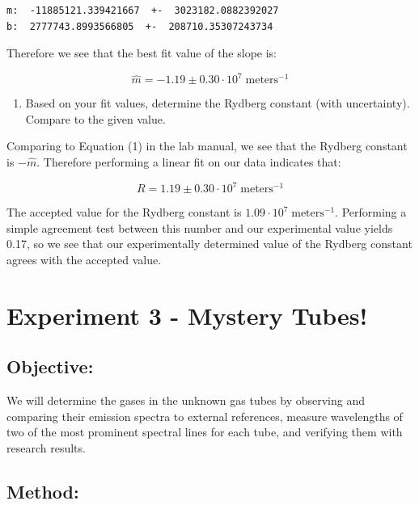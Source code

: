 \documentclass[11pt]{article}
\providecommand{\tightlist}{%
      \setlength{\itemsep}{0pt}\setlength{\parskip}{0pt}}
\begin{document}
    \begin{Verbatim}[commandchars=\\\{\}]
m:  -11885121.339421667  +-  3023182.0882392027
b:  2777743.8993566805  +-  208710.35307243734
\end{Verbatim}

    Therefore we see that the best fit value of the slope is:

\[\boxed{\hat{m} = -1.19 \pm 0.30 \cdot 10^7 \; \text{meters} ^{-1}}\]

\begin{enumerate}
\def\labelenumi{\alph{enumi})}
\setcounter{enumi}{2}
\tightlist
\item
  Based on your fit values, determine the Rydberg constant (with
  uncertainty). Compare to the given value.
\end{enumerate}

Comparing to Equation (1) in the lab manual, we see that the Rydberg
constant is \(-\hat{m}\). Therefore performing a linear fit on our data
indicates that:

\[\boxed{ R = 1.19 \pm 0.30 \cdot 10^7 \; \text{meters} ^{-1}}\]

The accepted value for the Rydberg constant is
\(1.09 \cdot 10^7 \; \text{meters} ^{-1}\). Performing a simple
agreement test between this number and our experimental value yields
0.17, so we see that our experimentally determined value of the Rydberg
constant agrees with the accepted value.

    \hypertarget{experiment-3---mystery-tubes}{%
\section{Experiment 3 - Mystery
Tubes!}\label{experiment-3---mystery-tubes}}

\hypertarget{objective}{%
\subsection{Objective:}\label{objective}}

We will determine the gases in the unknown gas tubes by observing and
comparing their emission spectra to external references, measure
wavelengths of two of the most prominent spectral lines for each tube,
and verifying them with research results.

\hypertarget{method}{%
\subsection{Method:}\label{method}}
\end{document}
